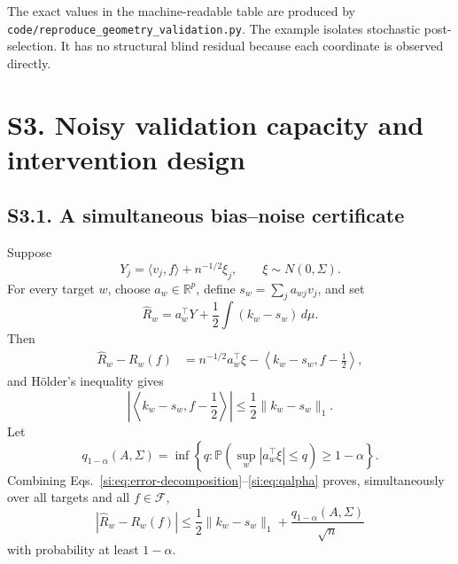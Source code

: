 \documentclass[10pt,twocolumn]{article}
\newcommand{\Prb}{\mathbb{P}}
\newcommand{\cF}{\mathcal F}
\begin{document}
The exact values in the machine-readable table are produced by \texttt{code/reproduce\_geometry\_validation.py}. The example isolates stochastic post-selection. It has no structural blind residual because each coordinate is observed directly.

\section*{S3. Noisy validation capacity and intervention design}

\subsection*{S3.1. A simultaneous bias--noise certificate}

Suppose
\begin{equation}
Y_j=\langle v_j,f\rangle+n^{-1/2}\xi_j,
\qquad \xi\sim N(0,\Sigma).
\label{si:eq:noisy-model}
\end{equation}
For every target $w$, choose $a_w\in\mathbb R^p$, define $s_w=\sum_ja_{wj}v_j$, and set
\begin{equation}
\widehat R_w=a_w^\top Y+\frac12\int(k_w-s_w)\,d\mu.
\label{si:eq:noisy-estimator}
\end{equation}
Then
\begin{align}
\widehat R_w-R_w(f)
&=n^{-1/2}a_w^\top\xi
-\left\langle k_w-s_w,f-\frac12\right\rangle,
\label{si:eq:error-decomposition}
\end{align}
and H\"older's inequality gives
\begin{equation}
\left|\left\langle k_w-s_w,f-\frac12\right\rangle\right|
\le\frac12\|k_w-s_w\|_1.
\label{si:eq:biasbound}
\end{equation}
Let
\begin{equation}
q_{1-\alpha}(A,\Sigma)
=\inf\left\{q:\Prb\left(\sup_w|a_w^\top\xi|\le q\right)\ge1-\alpha\right\}.
\label{si:eq:qalpha}
\end{equation}
Combining Eqs.~\ref{si:eq:error-decomposition}--\ref{si:eq:qalpha} proves, simultaneously over all targets and all $f\in\cF$,
\begin{equation}
|\widehat R_w-R_w(f)|
\le\frac12\|k_w-s_w\|_1+\frac{q_{1-\alpha}(A,\Sigma)}{\sqrt n}
\label{si:eq:simband}
\end{equation}
with probability at least $1-\alpha$.
\end{document}
